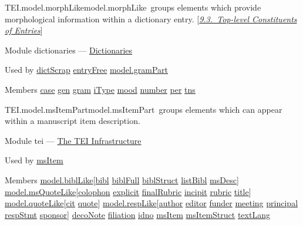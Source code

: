 \begin{reflist}
\item[]\begin{specHead}{TEI.model.morphLike}{model.morphLike} groups elements which provide morphological information within a dictionary entry. [\textit{\hyperref[DITP]{9.3.\ Top-level Constituents of Entries}}]\end{specHead} 
    \item[{Module}]
  dictionaries — \hyperref[DI]{Dictionaries}
    \item[{Used by}]
  \hyperref[TEI.dictScrap]{dictScrap} \hyperref[TEI.entryFree]{entryFree} \hyperref[TEI.model.gramPart]{model.gramPart}
    \item[{Members}]
  \hyperref[TEI.case]{case} \hyperref[TEI.gen]{gen} \hyperref[TEI.gram]{gram} \hyperref[TEI.iType]{iType} \hyperref[TEI.mood]{mood} \hyperref[TEI.number]{number} \hyperref[TEI.per]{per} \hyperref[TEI.tns]{tns}
\end{reflist}  
\begin{reflist}
\item[]\begin{specHead}{TEI.model.msItemPart}{model.msItemPart} groups elements which can appear within a manuscript item description.\end{specHead} 
    \item[{Module}]
  tei — \hyperref[ST]{The TEI Infrastructure}
    \item[{Used by}]
  \hyperref[TEI.msItem]{msItem}
    \item[{Members}]
  \hyperref[TEI.model.biblLike]{model.biblLike}[\hyperref[TEI.bibl]{bibl} \hyperref[TEI.biblFull]{biblFull} \hyperref[TEI.biblStruct]{biblStruct} \hyperref[TEI.listBibl]{listBibl} \hyperref[TEI.msDesc]{msDesc}] \hyperref[TEI.model.msQuoteLike]{model.msQuoteLike}[\hyperref[TEI.colophon]{colophon} \hyperref[TEI.explicit]{explicit} \hyperref[TEI.finalRubric]{finalRubric} \hyperref[TEI.incipit]{incipit} \hyperref[TEI.rubric]{rubric} \hyperref[TEI.title]{title}] \hyperref[TEI.model.quoteLike]{model.quoteLike}[\hyperref[TEI.cit]{cit} \hyperref[TEI.quote]{quote}] \hyperref[TEI.model.respLike]{model.respLike}[\hyperref[TEI.author]{author} \hyperref[TEI.editor]{editor} \hyperref[TEI.funder]{funder} \hyperref[TEI.meeting]{meeting} \hyperref[TEI.principal]{principal} \hyperref[TEI.respStmt]{respStmt} \hyperref[TEI.sponsor]{sponsor}] \hyperref[TEI.decoNote]{decoNote} \hyperref[TEI.filiation]{filiation} \hyperref[TEI.idno]{idno} \hyperref[TEI.msItem]{msItem} \hyperref[TEI.msItemStruct]{msItemStruct} \hyperref[TEI.textLang]{textLang}
\end{reflist}  
